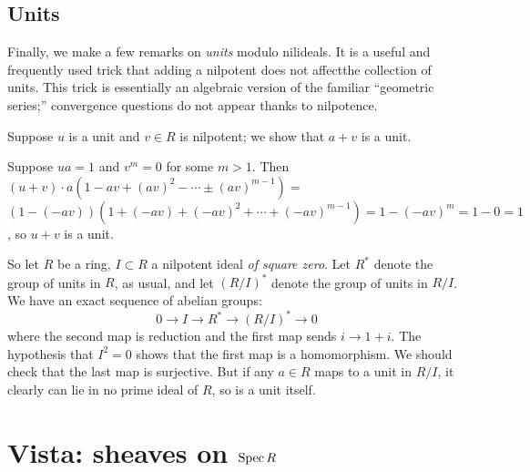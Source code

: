 \subsection{Units}
Finally, we make a few remarks on \emph{units} modulo nilideals.
It is a useful and frequently used trick that adding a nilpotent does not
affectthe collection of units. This trick is essentially an algebraic version of
the
familiar ``geometric series;'' convergence questions do not appear thanks to
nilpotence. 

\begin{example} 
Suppose $u$ is a unit and $v \in R$ is nilpotent; we show that $a+v$ is a unit.

Suppose $ua=1$ and $v^m=0$ for some
$m>1$. Then  $(u+v)\cdot a(1-av+(av)^2-\cdots\pm(av)^{m-1})=$
$(1-(-av))(1+(-av)+(-av)^2+\cdots+(-av)^{m-1})=1-(-av)^m=1-0=1$, so $u+v$
is a unit.
\end{example} 




So let $R$ be a ring, $I \subset R$ a nilpotent ideal \emph{of square zero}. 
Let $R^*$ denote the group of units in $R$, as usual, and let $(R/I)^*$ denote
the
group of units in $R/I$.
We have an exact sequence of abelian groups:
\[ 0 \to I \to R^* \to (R/I)^* \to 0  \]
where the second map is reduction and the first map sends $i \to 1+i$.
The hypothesis that $I^2 = 0$ shows that the first map is a homomorphism.
We should check that the last map is surjective. But if any $a \in R$ maps to a
unit in $R/I$, it clearly can lie in no prime ideal of $R$, so is a unit itself.
\section{Vista: sheaves on $\operatorname{Spec} R$}

